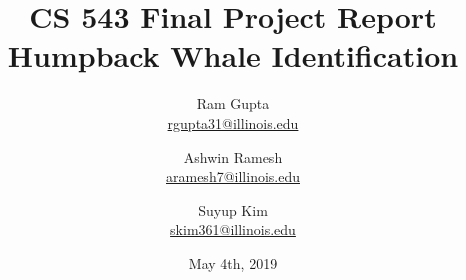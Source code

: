\documentclass[12pt,letterpaper]{article}
\title{CS 543 Final Project Report\\
Humpback Whale Identification}
\author{
    Ram Gupta\\     
    \href{mailto:rgupta31@illinois.edu}{rgupta31@illinois.edu} 
    \and Ashwin Ramesh\\     
    \href{mailto:aramesh7@illinois.edu}{aramesh7@illinois.edu} 
    \and Suyup Kim\\
    \href{mailto:skim361@illinois.edu}{skim361@illinois.edu} 
   }
\date{May 4th, 2019}
\begin{document}
\maketitle



%
%

%

%



\pagebreak


\end{document}
